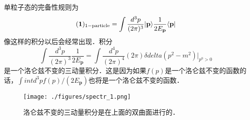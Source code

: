 单粒子态的完备性规则为
\begin{equation}
(\boldsymbol 1)_{\rm 1-particle} = \int \frac{d^3p}{(2\pi)^3} |\mathbf p\rangle \frac{1}{2 E_{\mathbf p}} \langle \mathbf p |
\end{equation}
像这样的积分以后会经常出现．积分
\begin{equation}
\int \frac{d^3p}{(2\pi)^3} \frac{1}{2 E_{\mathbf p}} = \int \frac{d^4 p}{(2\pi)^4} (2\pi) \delta delta(p^2 - m^2) \bigg|_{p^0>0}
\end{equation}
是一个洛仑兹不变的三动量积分．这是因为如果$f(p)$是一个洛仑兹不变的函数的话，$\int int d^3 p f(p)/(2E_{\mathbf p})$也将是一个洛仑兹不变的函数．
\begin{figure}[ht]
\centering
\texttt{[image: ./figures/spectr\_1.png]}
\caption{洛仑兹不变的三动量积分是在上面的双曲面进行的．} \label{spectr_fig1}
\end{figure}
